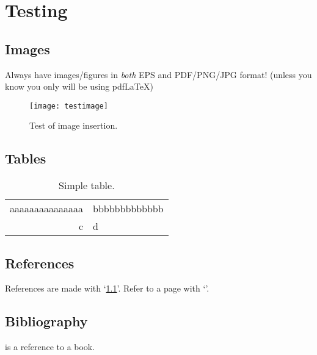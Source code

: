 \chapter{Testing}
\section{Images}
Always have images/figures in \emph{both} EPS and PDF/PNG/JPG format! (unless you know you only will be using pdfLaTeX)


\begin{figure}[!tbh]
	\centering
	\texttt{[image: testimage]}
	\caption{Test of image insertion.}
	\label{fig:testimage}
\end{figure}

\section{Tables}
\begin{table}[!h]
\centering%
\caption{Simple table.}\label{tab:table}
\begin{tabular}{| r l |}
   \hline
   aaaaaaaaaaaaaaa & bbbbbbbbbbbbb\\
   c & d\\
   \hline
\end{tabular}
\end{table}

\section{References} References are made with `\ref{tab:table}'. Refer to a page with 
`\pageref{tab:tabel}'.

\section{Bibliography} \cite{Deitel:2002} is a reference to a book.